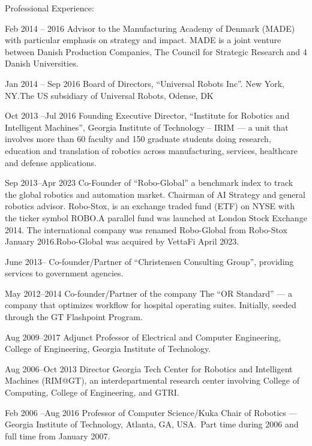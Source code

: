 \documentclass{article}
\begin{document}
\begin{cv}
\begin{cvlist}{Professional Experience:}
		\item[Feb 2014 -- 2016] Advisor to the Manufacturing Academy of
		Denmark (MADE) with particular emphasis on strategy and impact. MADE
		is a joint venture between Danish Production Companies, The Council
		for Strategic Research and 4 Danish Universities.

		\item[Jan 2014 -- Sep 2016] Board of Directors, ``Universal Robots
		Inc''. New York, NY.\@ The US subsidiary of Universal Robots, Odense,
		DK

		\item[Oct 2013 --Jul 2016] Founding Executive Director, ``Institute
		for Robotics and Intelligent Machines'', Georgia Institute of
		Technology -- IRIM --- a unit that involves more than 60 faculty and
		150 graduate students doing research, education and translation of
		robotics across manufacturing, services, healthcare and defense
		applications.

		\item[Sep 2013--Apr 2023] Co-Founder of ``Robo-Global'' a benchmark index to
		track the global robotics and automation market. Chairman of AI Strategy and
		general robotics advisor. Robo-Stox, is an exchange traded fund (ETF) on NYSE
		with the ticker symbol ROBO.\@ A parallel fund was launched at London Stock
		Exchange 2014. The international company was renamed Robo-Global from
		Robo-Stox January 2016.\@ Robo-Global was acquired by VettaFi April 2023.

		\item[June 2013--] Co-founder/Partner of  ``Christensen
		Consulting Group'', providing services to government agencies.

		\item[May 2012--2014] Co-founder/Partner of the company The ``OR
		Standard'' --- a company that optimizes workflow for hospital
		operating suites. Initially, seeded through the GT Flashpoint
		Program.

		\item[Aug 2009--2017] Adjunct Professor of Electrical and Computer
		Engineering, College of Engineering, Georgia Institute of
		Technology.

		\item[Aug 2006--Oct 2013] Director Georgia Tech Center for Robotics and
		Intelligent Machines (RIM@GT), an interdepartmental research center
		involving College of Computing, College of Engineering, and GTRI.\@

		\item[Feb 2006 --Aug 2016]  Professor of Computer Science/Kuka
		Chair of Robotics --- Georgia Institute of Technology, Atlanta, GA,
		USA.\ Part time during 2006 and full time from January 2007.


\end{cvlist}
\end{cv}
\end{document}
